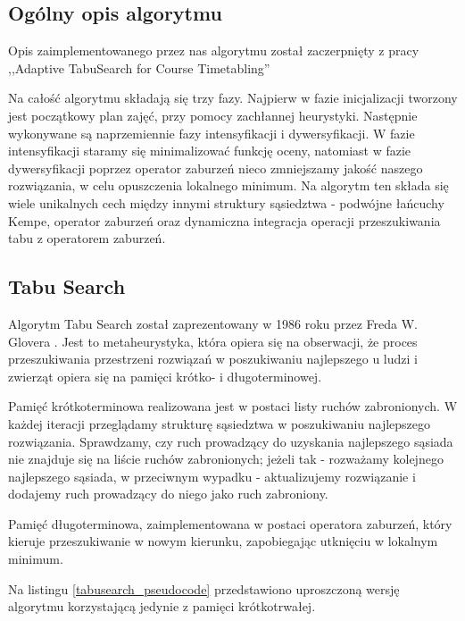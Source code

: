 \subsection{Ogólny opis algorytmu}
\label{ats_description}
\par Opis zaimplementowanego przez nas algorytmu został zaczerpnięty z pracy ,,Adaptive TabuSearch for Course Timetabling'' \cite{tabu}
\par Na całość algorytmu składają się trzy fazy. Najpierw w fazie inicjalizacji tworzony jest początkowy plan zajęć, przy pomocy zachłannej heurystyki. Następnie wykonywane są naprzemiennie fazy intensyfikacji i dywersyfikacji. W fazie intensyfikacji staramy się minimalizować funkcję oceny, natomiast w fazie dywersyfikacji poprzez operator zaburzeń nieco zmniejszamy jakość naszego rozwiązania, w celu opuszczenia lokalnego minimum. Na algorytm ten składa się wiele unikalnych cech między innymi struktury sąsiedztwa - podwójne łańcuchy Kempe, operator zaburzeń oraz dynamiczna integracja operacji przeszukiwania tabu z operatorem zaburzeń.

\subsection{Tabu Search}
\label{tabu_search}
\par Algorytm Tabu Search został zaprezentowany w 1986 roku przez Freda W. Glovera \cite{glover}. Jest to metaheurystyka, która opiera się na obserwacji, że proces przeszukiwania przestrzeni rozwiązań w poszukiwaniu najlepszego u ludzi i zwierząt opiera się na pamięci krótko- i długoterminowej. 
\par Pamięć krótkoterminowa realizowana jest w postaci listy ruchów zabronionych. W każdej iteracji przeglądamy strukturę sąsiedztwa w poszukiwaniu najlepszego rozwiązania. Sprawdzamy, czy ruch prowadzący do uzyskania najlepszego sąsiada nie znajduje się na liście ruchów zabronionych; jeżeli tak - rozważamy kolejnego najlepszego sąsiada, w przeciwnym wypadku - aktualizujemy rozwiązanie i dodajemy ruch prowadzący do niego jako ruch zabroniony.
\par Pamięć długoterminowa, zaimplementowana w postaci operatora zaburzeń, który kieruje przeszukiwanie w nowym kierunku, zapobiegając utknięciu w lokalnym minimum.
\par Na listingu \ref{tabusearch_pseudocode} przedstawiono uproszczoną wersję algorytmu korzystającą jedynie z pamięci krótkotrwałej.

